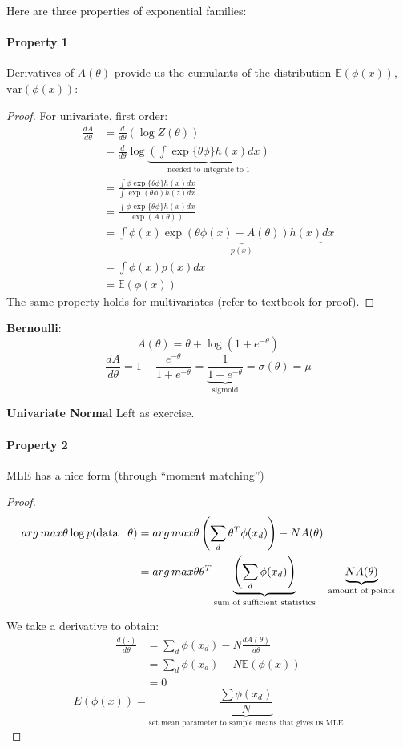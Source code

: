 \documentclass{article}
\begin{document}
Here are three properties of exponential families:

\paragraph{Property 1} Derivatives of $A(\theta)$ provide us the cumulants of the distribution $\mathbb{E}(\phi(x))$, $\text{var}(\phi(x))$:
\begin{proof}
For univariate, first order:
\begin{align*}
\frac{d A}{d \theta} &= \frac{d}{d\theta}(\log Z(\theta)) \\
&= \frac{d}{d \theta} \log \underbrace{\left(\int \exp\{\theta \phi\} h(x) dx\right)}_{\text{needed to integrate to $1$}} \\
&= \frac{\int\phi \exp\{\theta\phi\}h(x) dx}{\int \exp( \theta \phi) h(z) dx}\\
&= \frac{\int\phi \exp\{\theta\phi\}h(x) dx}{\exp(A(\theta))} \\
&= \int \phi(x) \underbrace{\exp(\theta \phi(x) - A(\theta)) h(x)}_{p(x)} dx\\
&= \int \phi(x) p(x) dx \\
&= \mathbb{E}(\phi(x))
\end{align*}
The same property holds for multivariates (refer to textbook for proof). 
\end{proof}

\textbf{Bernoulli}: 
\[A(\theta) = \theta + \log(1 + e^{-\theta})\]
\[\frac{d A}{d\theta} = 1 - \frac{e^{-\theta}}{1 + e^{-\theta}} = \underbrace{\frac{1}{1 + e^{-\theta}}}_{\text{sigmoid}} = \sigma(\theta) = \mu \]

\textbf{Univariate Normal} Left as exercise.
\paragraph{Property 2} MLE has a nice form (through ``moment matching'')
\begin{proof}
\begin{align*} arg\,max{\theta} \log p(\text{data} \mid \theta) &= arg\,max{\theta} \left(\sum_d \theta^T\phi(x_d)\right) - NA(\theta) \\
&= arg\,max{\theta}\theta^T\underbrace{\left(\sum_d\phi(x_d)\right)}_{\text{sum of sufficient statistics}} - \underbrace{NA(\theta)}_{\text{amount of points}}
\end{align*}

We take a derivative to obtain:
\begin{align*}
\frac{d(.)}{d \theta} &= \sum_d \phi(x_d) - N \frac{dA(\theta)}{d \theta} \\
&= \sum_d\phi(x_d) - N\mathbb{E}(\phi(x)) \\
 &= 0
\end{align*}
\[{E}(\phi(x)) = \underbrace{\frac{\sum\phi(x_d)}{N}}_{\text{set mean parameter to sample means that gives us MLE}}
\]
\end{proof}
\end{document}
